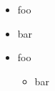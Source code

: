 
\def\mytitle{List Edge}


\begin{itemize}
\item foo

\item bar

\item foo

\begin{itemize}
\item bar

\end{itemize}

\end{itemize}



